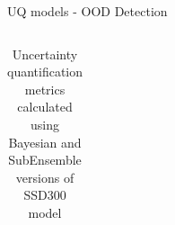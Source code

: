 \documentclass[10pt, aspectratio=169]{beamer}
\begin{document}
\begin{frame}[allowframebreaks]{UQ models - OOD Detection}
\pagebreak
\begin{columns}
    \begin{table}[H]
        \centering
        \footnotesize
        \caption{Uncertainty quantification metrics calculated using Bayesian and SubEnsemble versions of SSD300 model}
        \label{tab:my-table}
        \begin{tabular}{llll}

\end{tabular}
\end{table}
\end{columns}
\end{frame}
\end{document}
